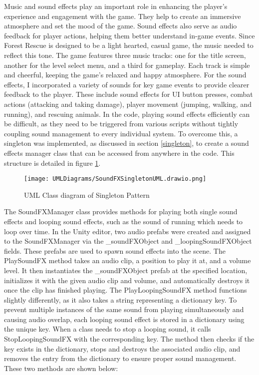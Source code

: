 \documentclass[10pt]{final_report}
\begin{document}
Music and sound effects play an important role in enhancing the player's experience and engagement with the game. They help to create an immersive atmosphere and set the mood of the game. Sound effects also serve as audio feedback for player actions, helping them better understand in-game events. Since Forest Rescue is designed to be a light hearted, casual game, the music needed to reflect this tone. The game features three music tracks: one for the title screen, another for the level select menu, and a third for gameplay. Each track is simple and cheerful, keeping the game's relaxed and happy atmosphere. For the sound effects, I incorporated a variety of sounds for key game events to provide clearer feedback to the player. These include sound effects for UI button presses, combat actions (attacking and taking damage), player movement (jumping, walking, and running), and rescuing animals. 
\newline
In the code, playing sound effects efficiently can be difficult, as they need to be triggered from various scripts without tightly coupling sound management to every individual system. To overcome this, a singleton was implemented, as discussed in section \ref{singleton}, to create a sound effects manager class that can be accessed from anywhere in the code. This structure is detailed in figure \ref{fig:label_singletonSoundFX}.
\begin{figure}[H]
    \centering
    \texttt{[image: UMLDiagrams/SoundFXSingletonUML.drawio.png]}
    \caption{UML Class diagram of Singleton Pattern}
    \label{fig:label_singletonSoundFX}
\end{figure}

The SoundFXManager class provides methods for playing both single sound effects and looping sound effects, such as the sound of running which needs to loop over time. In the Unity editor, two audio prefabs were created and assigned to the SoundFXManager via the \_soundFXObject and \_loopingSoundFXObject fields. These prefabs are used to spawn sound effects into the scene. The PlaySoundFX method takes an audio clip, a position to play it at, and a volume level. It then instantiates the \_soundFXObject prefab at the specified location, initializes it with the given audio clip and volume, and automatically destroys it once the clip has finished playing. The PlayLoopingSoundFX method functions slightly differently, as it also takes a string representing a dictionary key. To prevent multiple instances of the same sound from playing simultaneously and causing audio overlap, each looping sound effect is stored in a dictionary using the unique key. When a class needs to stop a looping sound, it calls StopLoopingSoundFX with the corresponding key. The method then checks if the key exists in the dictionary, stops and destroys the associated audio clip, and removes the entry from the dictionary to ensure proper sound management. These two methods are shown below:
\end{document}
